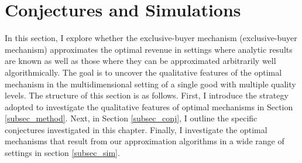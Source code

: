 



\section{Conjectures and Simulations}\label{sec_sim}


In this section, I explore whether the exclusive-buyer mechanism (exclusive-buyer mechanism) approximates the optimal revenue in settings where analytic results are known as well as those where they can be approximated arbitrarily well algorithmically. The goal is to uncover the qualitative features of the optimal mechanism in the multidimensional setting of a single good with multiple quality levels. The structure of this section is as follows. First, I introduce the strategy adopted to investigate the qualitative features of optimal mechanisms in Section \ref{subsec_method}. Next, in Section \ref{subsec_conj}, I outline the specific conjectures investigated in this chapter. Finally, I investigate the optimal mechanisms that result from our approximation algorithms in a wide range of settings in section \ref{subsec_sim}.






